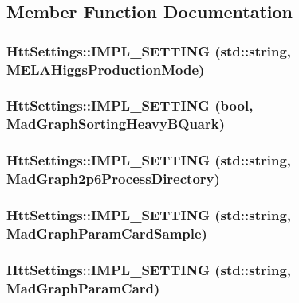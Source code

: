 \subsection{Member Function Documentation}
\hypertarget{classHttSettings_af49255f4051c7dcb6547ece3b3a2cff5}{
\subsubsection[{IMPL\_\-SETTING}]{\setlength{\rightskip}{0pt plus 5cm}HttSettings::IMPL\_\-SETTING (std::string, \/  MELAHiggsProductionMode)}}
\label{classHttSettings_af49255f4051c7dcb6547ece3b3a2cff5}
\hypertarget{classHttSettings_a20711c4a2bda634227ba9127f37cc97f}{
\subsubsection[{IMPL\_\-SETTING}]{\setlength{\rightskip}{0pt plus 5cm}HttSettings::IMPL\_\-SETTING (bool, \/  MadGraphSortingHeavyBQuark)}}
\label{classHttSettings_a20711c4a2bda634227ba9127f37cc97f}
\hypertarget{classHttSettings_a1eeccbffbcab60449a06a669d164d79c}{
\subsubsection[{IMPL\_\-SETTING}]{\setlength{\rightskip}{0pt plus 5cm}HttSettings::IMPL\_\-SETTING (std::string, \/  MadGraph2p6ProcessDirectory)}}
\label{classHttSettings_a1eeccbffbcab60449a06a669d164d79c}
\hypertarget{classHttSettings_a5c88b182940146dcefaf3625c16ab3e4}{
\subsubsection[{IMPL\_\-SETTING}]{\setlength{\rightskip}{0pt plus 5cm}HttSettings::IMPL\_\-SETTING (std::string, \/  MadGraphParamCardSample)}}
\label{classHttSettings_a5c88b182940146dcefaf3625c16ab3e4}
\hypertarget{classHttSettings_ab215ffcb567aceff98b8289457827490}{
\subsubsection[{IMPL\_\-SETTING}]{\setlength{\rightskip}{0pt plus 5cm}HttSettings::IMPL\_\-SETTING (std::string, \/  MadGraphParamCard)}}
